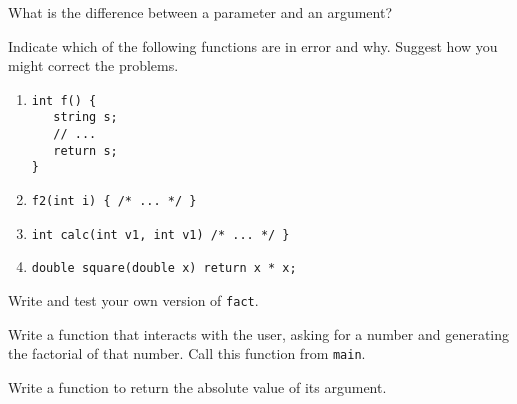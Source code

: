 %
%
\begin{question}
What is the difference between a parameter and an argument?
\end{question}

\begin{question}
Indicate which of the following functions are in error and why.
Suggest how you might correct the problems.
\begin{enumerate}[label=(\alph*)]
^^I\item
\begin{lstlisting}
int f() {
   string s;
   // ...
   return s;
}
\end{lstlisting}

^^I\item
\begin{lstlisting}
f2(int i) { /* ... */ }
\end{lstlisting}

^^I\item
\begin{lstlisting}
int calc(int v1, int v1) /* ... */ }
\end{lstlisting}

^^I\item
\begin{lstlisting}
double square(double x) return x * x;
\end{lstlisting}
\end{enumerate}
\end{question}

\begin{question}
Write and test your own version of \verb|fact|.
\end{question}

\begin{question}
Write a function that interacts with the user, asking for a
number and generating the factorial of that number. Call this function from
\verb|main|.
\end{question}

\begin{question}
Write a function to return the absolute value of its argument.
\end{question}
